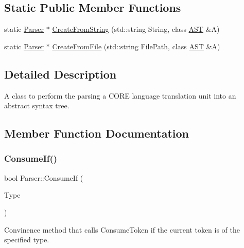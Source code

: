 \subsection*{Static Public Member Functions}
\begin{DoxyCompactItemize}
\item 
static \mbox{\hyperlink{class_parser}{Parser}} $\ast$ \mbox{\hyperlink{class_parser_a9b192cbac9570cca9dd22c64d2212747}{Create\+From\+String}} (std\+::string String, class \mbox{\hyperlink{class_a_s_t}{A\+ST}} \&A)
\item 
static \mbox{\hyperlink{class_parser}{Parser}} $\ast$ \mbox{\hyperlink{class_parser_a9dec351ab37990879df527597383442a}{Create\+From\+File}} (std\+::string File\+Path, class \mbox{\hyperlink{class_a_s_t}{A\+ST}} \&A)
\end{DoxyCompactItemize}


\subsection{Detailed Description}
A class to perform the parsing a C\+O\+RE language translation unit into an abstract syntax tree. 

\subsection{Member Function Documentation}
\mbox{\label{class_parser_aface90ca5edbe4709e3aed46250062da}} 
\subsubsection{\texorpdfstring{ConsumeIf()}{ConsumeIf()}\hspace{0.1cm}{\footnotesize\ttfamily [1/2]}}
{\footnotesize\ttfamily bool Parser\+::\+Consume\+If (\begin{DoxyParamCaption}\item[{Token\+Type\+::\+Token\+Type}]{Type }\end{DoxyParamCaption})}

Convinence method that calls {\ttfamily Consume\+Token} if the current token is of the specified type. \mbox{\label{class_parser_a692cce2c9f518b58f95ee6d5471423b7}} 
